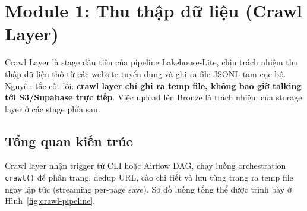 
\usepackage[utf8]{inputenc}
\usepackage[T5]{fontenc}
\usepackage{listings}
\usepackage{xcolor}
\lstset{style=pystyle}

\usepackage{graphicx}
\usepackage{booktabs}
\usepackage{longtable}
\usepackage{hyperref}


\section{Module 1: Thu thập dữ liệu (Crawl Layer)}
\label{sec:crawl-layer}

Crawl Layer là stage đầu tiên của pipeline Lakehouse-Lite, chịu trách nhiệm thu
thập dữ liệu thô từ các website tuyển dụng và ghi ra file JSONL tạm cục bộ.
Nguyên tắc cốt lõi: \textbf{crawl layer chỉ ghi ra temp file, không bao giờ
talking tới S3/Supabase trực tiếp}. Việc upload lên Bronze là trách nhiệm của
storage layer ở các stage phía sau.


\subsection{Tổng quan kiến trúc}
\label{subsec:crawl-overview}

Crawl layer nhận trigger từ CLI hoặc Airflow DAG, chạy luồng orchestration
\texttt{crawl()} để phân trang, dedup URL, cào chi tiết và lưu từng trang ra
temp file ngay lập tức (streaming per-page save). Sơ đồ luồng tổng thể được
trình bày ở Hình~\ref{fig:crawl-pipeline}.

